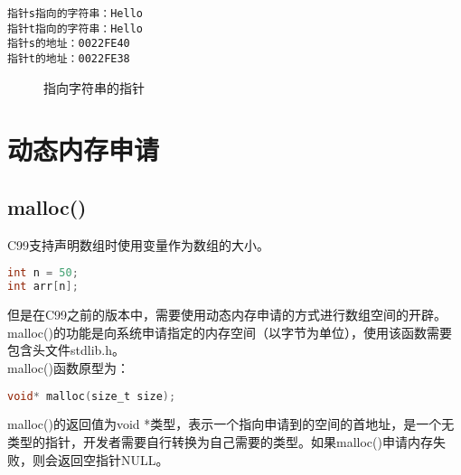 \begin{tcolorbox}
	\begin{verbatim}
指针s指向的字符串：Hello
指针t指向的字符串：Hello
指针s的地址：0022FE40
指针t的地址：0022FE38
	\end{verbatim}
\end{tcolorbox}

\begin{figure}[H]
	\centering
	\caption{指向字符串的指针}
\end{figure}

\newpage

\section{动态内存申请}

\subsection{malloc()}

C99支持声明数组时使用变量作为数组的大小。

\vspace{-0.5cm}

\begin{lstlisting}[language=C]
int n = 50;
int arr[n];
\end{lstlisting}

但是在C99之前的版本中，需要使用动态内存申请的方式进行数组空间的开辟。malloc()的功能是向系统申请指定的内存空间（以字节为单位），使用该函数需要包含头文件stdlib.h。\\

malloc()函数原型为：

\vspace{-0.5cm}

\begin{lstlisting}[language=C]
void* malloc(size_t size);
\end{lstlisting}

malloc()的返回值为void *类型，表示一个指向申请到的空间的首地址，是一个无类型的指针，开发者需要自行转换为自己需要的类型。如果malloc()申请内存失败，则会返回空指针NULL。\\

